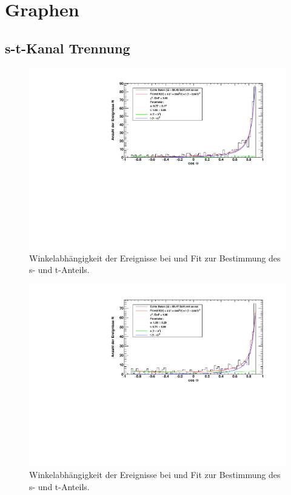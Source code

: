 \section{Graphen}
\subsection{s-t-Kanal Trennung}
\label{sub:app:st}
\begin{figure}[H]
    \begin{center}
        \includegraphics[width=\textwidth]{../img/s_t_fit_88-48.pdf}
        \caption{Winkelabhängigkeit der Ereignisse bei  und Fit zur Bestimmung des s- und t-Anteils.}
        \label{img:st:8848}
    \end{center}
\end{figure}

\begin{figure}[H]
    \begin{center}
        \includegraphics[width=\textwidth]{../img/s_t_fit_89-47.pdf}
        \caption{Winkelabhängigkeit der Ereignisse bei  und Fit zur Bestimmung des s- und t-Anteils.}
        \label{img:st:8947}
    \end{center}
\end{figure}

